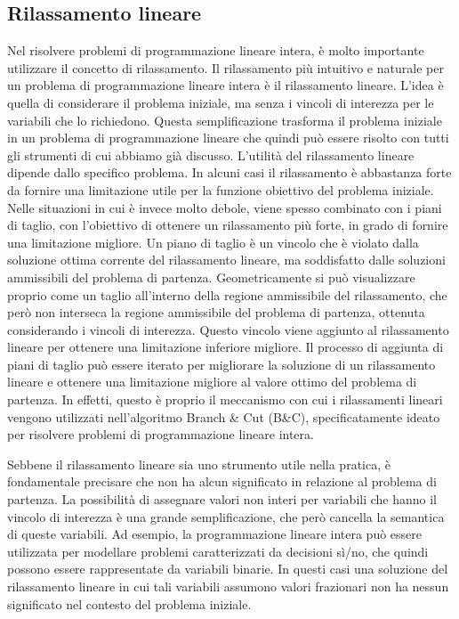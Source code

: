 \subsection{Rilassamento lineare}

Nel risolvere problemi di programmazione lineare intera, è molto importante utilizzare il concetto di rilassamento. Il
rilassamento più intuitivo e naturale per un problema di programmazione lineare intera è il rilassamento lineare. L'idea
è quella di considerare il problema iniziale, ma senza i vincoli di interezza per le variabili che lo richiedono.
Questa semplificazione trasforma il problema iniziale in un problema di programmazione lineare che quindi può essere
risolto con tutti gli strumenti di cui abbiamo già discusso. L'utilità del rilassamento lineare dipende dallo specifico
problema. In alcuni casi il rilassamento è abbastanza forte da fornire una limitazione utile per la funzione obiettivo
del problema iniziale. Nelle situazioni in cui è invece molto debole, viene spesso combinato con i piani di taglio, con
l'obiettivo di ottenere un rilassamento più forte, in grado di fornire una limitazione migliore. Un piano di taglio è un
vincolo che è violato dalla soluzione ottima corrente del rilassamento lineare, ma soddisfatto dalle soluzioni
ammissibili del problema di partenza. Geometricamente si può visualizzare proprio come un taglio all'interno della
regione ammissibile del rilassamento, che però non interseca la regione ammissibile del problema di partenza, ottenuta
considerando i vincoli di interezza. Questo vincolo viene aggiunto al rilassamento lineare per ottenere una limitazione
inferiore migliore. Il processo di aggiunta di piani di taglio può essere iterato per migliorare la soluzione di un
rilassamento lineare e ottenere una limitazione migliore al valore ottimo del problema di partenza. In effetti, questo
è proprio il meccanismo con cui i rilassamenti lineari vengono utilizzati nell'algoritmo Branch \& Cut (B\&C),
specificatamente ideato per risolvere problemi di programmazione lineare intera.

Sebbene il rilassamento lineare sia uno strumento utile nella pratica, è fondamentale precisare che non ha alcun
significato in relazione al problema di partenza. La possibilità di assegnare valori non interi per variabili che hanno
il vincolo di interezza è una grande semplificazione, che però cancella la semantica di queste variabili. Ad esempio, la
programmazione lineare intera può essere utilizzata per modellare problemi caratterizzati da decisioni sì/no, che quindi
possono essere rappresentate da variabili binarie. In questi casi una soluzione del rilassamento lineare in cui tali
variabili assumono valori frazionari non ha nessun significato nel contesto del problema iniziale.

